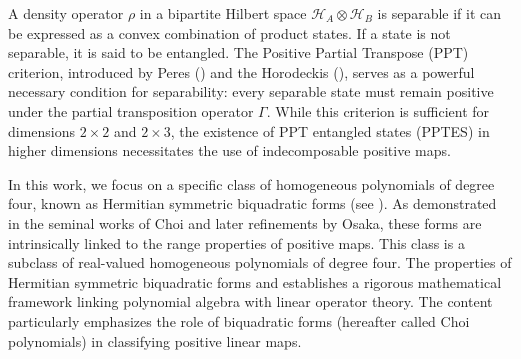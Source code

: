 \documentclass[12pt,a4paper]{amsart}
\theoremstyle{plain}
\theoremstyle{remark}
\theoremstyle{definition}
\begin{document}
A density operator $\rho$ in a bipartite Hilbert space $\mathcal{H}_A \otimes \mathcal{H}_B$ is separable if it can be expressed as a convex combination of product states. If a state is not separable, it is said to be entangled. The Positive Partial Transpose (PPT) criterion, introduced by Peres (\cite{Peres1996}) and the Horodeckis (\cite{Horodecki1997}), serves as a powerful necessary condition for separability: every separable state must remain positive under the partial transposition operator $\Gamma$. While this criterion is sufficient for dimensions $2 \times 2$ and $2 \times 3$, the existence of PPT entangled states (PPTES) in higher dimensions necessitates the use of indecomposable positive maps.

In this work, we focus on a specific class of homogeneous polynomials of degree four, known as Hermitian symmetric biquadratic forms (see \cite{A2011}). As demonstrated in the seminal works of Choi and later refinements by Osaka, these forms are intrinsically linked to the range properties of positive maps. 
This class is a subclass of real-valued homogeneous polynomials of degree four. The properties of Hermitian symmetric biquadratic forms and establishes a rigorous mathematical framework linking polynomial algebra with linear operator theory. The content particularly emphasizes the role of biquadratic forms (hereafter called Choi polynomials) in classifying positive linear maps.
\end{document}
